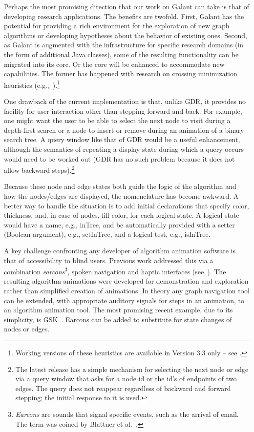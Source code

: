 Perhaps the most promising direction that our work on Galant can take is that
of developing research applications.  The benefits are twofold.  First,
Galant has the potential for providing a rich environment for the exploration
of new graph algorithms or developing hypotheses about the behavior of
existing ones.  Second, as Galant is augmented with the infrastructure for
specific research domains (in the form of additional Java classes), some of the
resulting functionality can be migrated into its core. Or the core
will be enhanced to accommodate new capabilities. The former
has happened with research on crossing
minimization heuristics (e.g.,~\cite{2012-JEA-Stallmann}).\footnote{
  Working versions of these heuristics are available in Version 3.3 only --
  see \url{}.
}

One drawback of the current implementation is
that, unlike GDR, it provides no facility for user interaction other than stepping forward
and back.
For example, one might want the user to be able to select the next node to
visit during a depth-first search or a node to insert or remove during an animation of
a binary search tree.
A query window like that of GDR would be a useful enhancement, although the semantics of
repeating a display state during which a query occurs would need to be worked out
(GDR has no such problem because it does not allow backward steps).\footnote{
  The latest release has a simple mechanism for selecting the next node or edge
  via a query window that asks for a node id or the id's of endpoints of two edges.
  The query does not reappear regardless of backward and forward stepping;
  the initial response to it is used.
}

  Because these node and edge states both guide the logic of the algorithm
  and how the nodes/edges are displayed, the nomenclature has become awkward.
  A better way to handle the situation is to add initial declarations
  that specify color, thickness, and, in case of nodes, fill color, for each logical state.
  A logical state would have a name, e.g., \textsf{inTree},
  and be automatically provided with a setter (Boolean argument),
  e.g., \textsf{setInTree}, and a logical test, e.g., \textsf{isInTree}.

A key challenge confronting any developer of algorithm animation
software is that of accessibility to blind users.
Previous work addressed this via a combination \emph{earcons}\footnote{
\emph{Earcons} are sounds that signal specific events, such as the arrival of email. The term was coined by Blattner et al.~\cite{1989-HCI-Blattner-earcons}.
}, spoken navigation
and haptic interfaces
(see~\cite{2002-SoftViz-Baloian,2005-SCCC-Baloian,2002-Diagrams-Bennett}).
The resulting algorithm animations were developed for demonstration and exploration rather than simplified
creation of
animations.
In theory any graph navigation tool can be extended, with appropriate auditory
signals for steps in an animation, to an algorithm animation tool.
The most promising recent example, due to its simplicity, is GSK~\cite{2013-SIGCSE-Balik}.
Earcons can be added to substitute for state changes of nodes or edges.

